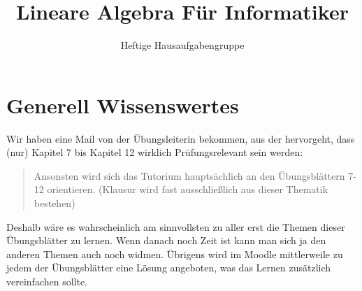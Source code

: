 \documentclass[12pt,a4paper]{article}
\author{Heftige Hausaufgabengruppe}
\title{Lineare Algebra Für Informatiker}
\begin{document}
\maketitle
\tableofcontents
\pagebreak
\section{Generell Wissenswertes}
Wir haben eine Mail von der Übungsleiterin bekommen, aus der hervorgeht, dass (nur) Kapitel 7 bis Kapitel 12 wirklich Prüfungsrelevant sein werden:
\begin{quote}
Ansonsten wird sich das Tutorium hauptsächlich an den Übungsblättern
7-12 orientieren.
(Klausur wird fast ausschließlich aus dieser Thematik bestehen)
\end{quote}
Deshalb wäre es wahrscheinlich am sinnvollsten zu aller erst die Themen dieser Übungsblätter zu lernen. Wenn danach noch Zeit ist kann man sich ja den anderen Themen auch noch widmen. Übrigens wird im Moodle mittlerweile zu jedem der Übungsblätter eine Lösung angeboten, was das Lernen zusätzlich vereinfachen sollte.
\end{document}
